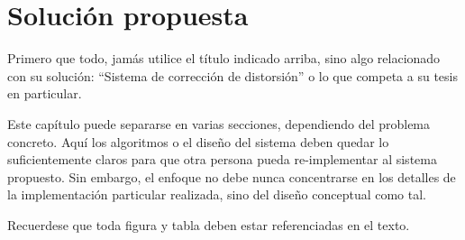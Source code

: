 \chapter{Solución propuesta}
\label{ch:solucion}

Primero que todo, jamás utilice el título indicado arriba, sino algo
relacionado con su solución: ``Sistema de corrección de distorsión'' o lo que
competa a su tesis en particular.

Este capítulo puede separarse en varias secciones, dependiendo del problema
concreto. Aquí los algoritmos o el diseño del sistema deben quedar lo
suficientemente claros para que otra persona pueda re-implementar al sistema
propuesto. Sin embargo, el enfoque no debe nunca concentrarse en los detalles
de la implementación particular realizada, sino del diseño conceptual como tal.

Recuerdese que toda figura y tabla deben estar referenciadas en el texto.
